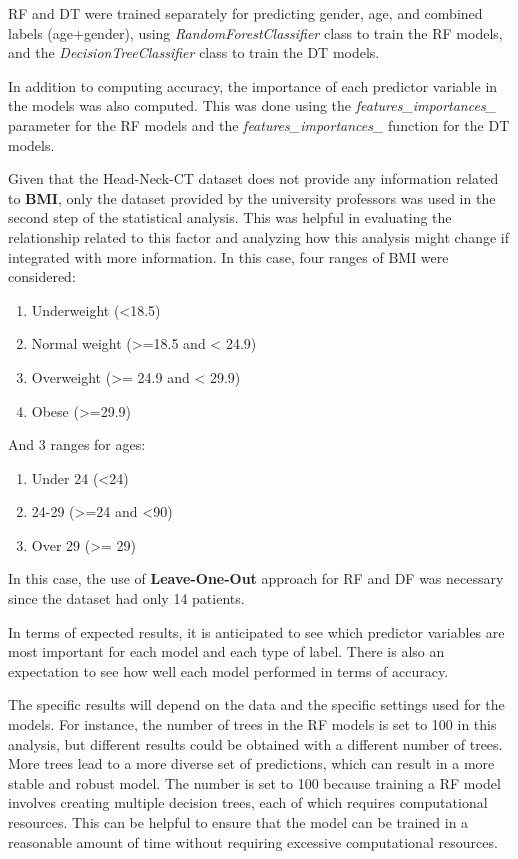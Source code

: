 \documentclass[journal,article,submit,pdftex,moreauthors]{Definitions/mdpi}
\begin{document}
RF and DT were trained separately for predicting gender, age, and combined labels (age+gender), using \textit{RandomForestClassifier} class to train the RF models, and the \textit{DecisionTreeClassifier} class to train the DT models.

In addition to computing accuracy, the importance of each predictor variable in the models was also computed. This was done using the \textit{features\_importances\_} parameter for the RF models and the \textit{features\_importances\_} function for the DT models.

Given that the Head-Neck-CT dataset does not provide any information related to \textbf{BMI}, only the dataset provided by the university professors was used in the second step of the statistical analysis. This was helpful in evaluating the relationship related to this factor and analyzing how this analysis might change if integrated with more information. 
In this case, four ranges of BMI were considered:

\begin{enumerate}
    \item Underweight (<18.5)
    \item Normal weight (>=18.5 and < 24.9)
    \item Overweight (>= 24.9 and < 29.9)
    \item Obese (>=29.9)
\end{enumerate}
And 3 ranges for ages:
\begin{enumerate}
    \item Under 24 (<24)
    \item 24-29 (>=24 and <90)
    \item Over 29 (>= 29) 
\end{enumerate}

In this case, the use of \textbf{Leave-One-Out} approach for RF and DF was necessary since the dataset had only 14 patients.
 
In terms of expected results, it is anticipated to see which predictor variables are most important for each model and each type of label. There is also an expectation to see how well each model performed in terms of accuracy. 

The specific results will depend on the data and the specific settings used for the models. For instance, the number of trees in the RF models is set to 100 in this analysis, but different results could be obtained with a different number of trees. More trees lead to a more diverse set of predictions, which can result in a more stable and robust model. 
The number is set to 100 because training a RF model involves creating multiple decision trees, each of which requires computational resources. This can be helpful to ensure that the model can be trained in a reasonable amount of time without requiring excessive computational resources.
\end{document}

